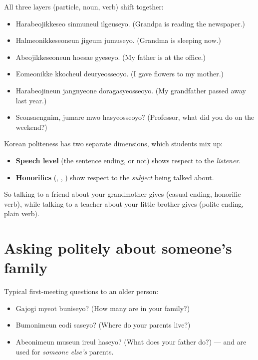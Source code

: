 \begin{example}
All three layers (particle, noun, verb) shift together:
\begin{itemize}
  \item {} Harabeojikkeseo sinmuneul ilgeuseyo. (Grandpa
        is reading the newspaper.)
  \item {} Halmeonikkeseoneun jigeum jumuseyo. (Grandma is
        sleeping now.)
  \item {} Abeojikkeseoneun hoesae gyeseyo. (My father is
        at the office.)
  \item {} Eomeonikke kkocheul deuryeosseoyo. (I gave flowers to
        my mother.)
  \item {} Harabeojineun jangnyeone doragasyeosseoyo.
        (My grandfather passed away last year.)
  \item {} Seonsaengnim, jumare mwo hasyeosseoyo?
        (Professor, what did you do on the weekend?)
\end{itemize}
\end{example}

\begin{important}
Korean politeness has two separate dimensions, which students mix up:
\begin{itemize}
  \item \textbf{Speech level} (the sentence ending,  or not) shows respect to
        the \emph{listener}.
  \item \textbf{Honorifics} (, , ) show respect to the
        \emph{subject} being talked about.
\end{itemize}
So talking to a friend about your grandmother gives  (casual ending,
honorific verb), while talking to a teacher about your little brother gives
 (polite ending, plain verb).
\end{important}

\section{Asking politely about someone's family}

\begin{example}
Typical first-meeting questions to an older person:
\begin{itemize}
  \item {} Gajogi myeot buniseyo? (How many are in your family?)
  \item {} Bumonimeun eodi saseyo? (Where do your parents live?)
  \item {} Abeonimeun museun ireul haseyo? (What does your
        father do?) ---  and  are used for \emph{someone else's}
        parents.
\end{itemize}
\end{example}

